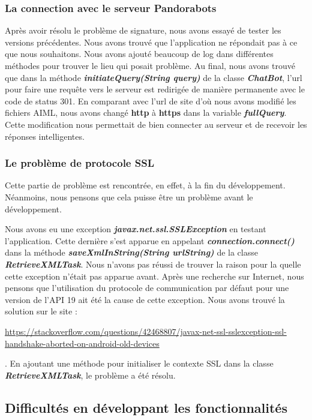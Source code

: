 \subsubsection{La connection avec le serveur Pandorabots}

\indent Après avoir résolu le problème de signature, nous avons essayé de tester les versions précédentes. Nous avons trouvé que l'application ne répondait pas à ce que nous souhaitons. Nous avons ajouté beaucoup de log dans différentes méthodes pour trouver le lieu qui posait problème. Au final, nous avons trouvé que dans la méthode \textbf{\emph{initiateQuery(String query)}} de la classe \textbf{\emph{ChatBot}}, l'url pour faire une requête vers le serveur est redirigée de manière permanente avec le code de status 301. En comparant avec l'url de site d'où nous avons modifié les fichiers AIML, nous avons changé \textbf{http} à \textbf{https} dans la variable \textbf{\emph{fullQuery}}. Cette modification nous permettait de bien connecter au serveur et de recevoir les réponses intelligentes.

\subsubsection{Le problème de protocole SSL}

\indent Cette partie de problème est rencontrée, en effet, à la fin du développement. Néanmoins, nous pensons que cela puisse être un problème avant le développement.

\indent Nous avons eu une exception \textbf{\emph{javax.net.ssl.SSLException}} en testant l'application. Cette dernière s'est apparue en appelant \textbf{\emph{connection.connect()}} dans la méthode \textbf{\emph{saveXmlInString(String urlString)}} de la classe \textbf{\emph{RetrieveXMLTask}}. Nous n'avons pas réussi de trouver la raison pour la quelle cette exception n'était pas apparue avant. Après une recherche sur Internet, nous pensons que l'utilisation du protocole de communication par défaut pour une version de l'API 19 ait été la cause de cette exception. Nous avons trouvé la solution sur le site : \begin{scriptsize} \url{https://stackoverflow.com/questions/42468807/javax-net-ssl-sslexception-ssl-handshake-aborted-on-android-old-devices}\end{scriptsize}. En ajoutant une méthode pour initialiser le contexte SSL dans la classe \textbf{\emph{RetrieveXMLTask}}, le problème a été résolu.

\subsection{Difficultés en développant les fonctionnalités}

